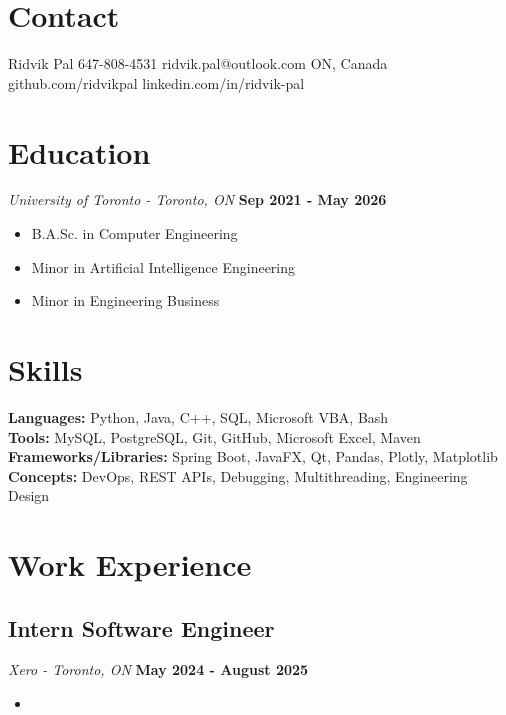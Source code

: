 \documentclass{article}
\begin{document}
\section*{Contact}

Ridvik Pal
\hfill
647-808-4531
\hfill
ridvik.pal@outlook.com
\hfill
ON, Canada
\hfill
github.com/ridvikpal
\hfill
linkedin.com/in/ridvik-pal

\section*{Education}

\textit{University of Toronto - Toronto, ON}
\hfill
\textbf{Sep 2021 - May 2026}
\begin{itemize}
    \item B.A.Sc. in Computer Engineering
    \item Minor in  Artificial Intelligence Engineering
    \item Minor in Engineering Business
\end{itemize}

\section*{Skills}

\textbf{Languages:} Python, Java, C++, SQL, Microsoft VBA, Bash \\
\textbf{Tools:} MySQL, PostgreSQL, Git, GitHub, Microsoft Excel, Maven \\
\textbf{Frameworks/Libraries:} Spring Boot, JavaFX, Qt, Pandas, Plotly, Matplotlib \\
\textbf{Concepts:} DevOps, REST APIs, Debugging, Multithreading, Engineering Design

\section*{Work Experience}

\subsection*{Intern Software Engineer}
\textit{Xero - Toronto, ON}
\hfill
\textbf{May 2024 - August 2025}
\begin{itemize}
    \item 
\end{itemize}
\end{document}
